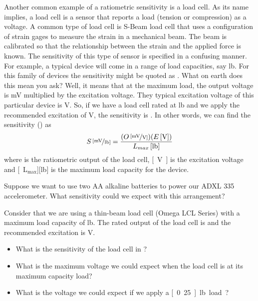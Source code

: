 Another common example of a ratiometric sensitivity is a load cell.  As its name implies, a load cell is a sensor that reports a load (tension or compression) as a voltage.  A common type of load cell is S-Beam load cell that uses a configuration of strain gages to measure the strain in a mechanical beam.  The beam is calibrated so that the relationship between the strain and the applied force is known.  The sensitivity of this type of sensor is specified in a confusing manner.  For example, a typical device will come in a range of load capacities, say \unit[25-10,000]{lb}.  For this family of devices the sensitivity might be quoted as .  What on earth does this mean you ask?  Well, it means that at the maximum load, the output voltage is \unit[3]{mV} multiplied by the excitation voltage.  They typical excitation voltage of this particular device is \unit[10]{V}.  So, if we have a load cell rated at \unit[100]{lb} and we apply the recommended excitation of \unit[10]{V}, the sensitivity is .  In other words, we can find the sensitivity () as
\begin{equation}\label{e:sens}
\unitfrac[S]{[mV}{lb]} = \frac{(\unitfrac[O]{[mV}{V]})(\unit[E]{[V]})}{\unit[L_{max}]{[lb]}}
\end{equation}
where \unitfrac[O]{[mV}{V]} is the ratiometric output of the load cell, \unit[E]{[V]} is the excitation voltage and \unit[L$_{\mathrm{max}}$]{[lb]} is the maximum load capacity for the device.
\begin{ex}
Suppose we want to use two AA alkaline batteries to power our ADXL 335 accelerometer.  What sensitivity could we expect with this arrangement?
\end{ex}
\begin{ex}
Consider that we are using a thin-beam load cell (Omega LCL Series) with a maximum load capacity of \unit[1]{lb}.  The rated output of the load cell is  and the recommended excitation is \unit[5]{V}.  
\begin{itemize}
\item What is the sensitivity of the load cell in ?
\item What is the maximum voltage we could expect when the load cell is at its maximum capacity load?
\item What is the voltage we could expect if we apply a \unit[0.25]{lb} load?
\end{itemize}
\end{ex}

